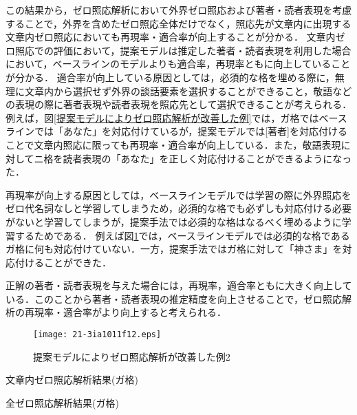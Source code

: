\documentclass[japanese]{jnlp_1.4}
\begin{document}
この結果から，ゼロ照応解析において外界ゼロ照応および著者・読者表現を考慮することで，外界を含めたゼロ照応全体だけでなく，照応先が文章内に出現する文章内ゼロ照応においても再現率・適合率が向上することが分かる．
文章内ゼロ照応での評価において，提案モデルは推定した著者・読者表現を利用した場合において，ベースラインのモデルよりも適合率，再現率ともに向上していることが分かる．
適合率が向上している原因としては，必須的な格を埋める際に，無理に文章内から選択せず外界の談話要素を選択することができること，敬語などの表現の際に著者表現や読者表現を照応先として選択できることが考えられる．
例えば，図\ref{提案モデルによりゼロ照応解析が改善した例}では，ガ格ではベースラインでは「あなた」を対応付けているが，提案モデルでは[著者]を対応付けることで文章内照応に限っても再現率・適合率が向上している．また，敬語表現に対してニ格を読者表現の「あなた」を正しく対応付けることができるようになった．

再現率が向上する原因としては，ベースラインモデルでは学習の際に外界照応をゼロ代名詞なしと学習してしまうため，必須的な格でも必ずしも対応付ける必要がないと学習してしまうが，提案手法では必須的な格はなるべく埋めるように学習するためである．
例えば図\ref{提案モデルによりゼロ照応解析が改善した例2}では，ベースラインモデルでは必須的な格であるガ格に何も対応付けていない．一方，提案手法ではガ格に対して「神さま」を対応付けることができた．

正解の著者・読者表現を与えた場合には，再現率，適合率ともに大きく向上している．このことから著者・読者表現の推定精度を向上させることで，ゼロ照応解析の再現率・適合率がより向上すると考えられる．

\begin{figure}[b]
\texttt{[image: 21-3ia1011f12.eps]}
\caption{提案モデルによりゼロ照応解析が改善した例2}
\label{提案モデルによりゼロ照応解析が改善した例2}
\end{figure}
\begin{table}[b]
\begin{minipage}{0.49\textwidth}
\caption{文章内ゼロ照応解析結果(ガ格)}
\label{文章内ゼロ照応解析結果(ガ格)}

\end{minipage}
\hfill
\begin{minipage}{0.49\textwidth}
\caption{全ゼロ照応解析結果(ガ格)}
\label{全ゼロ照応解析結果(ガ格)}

\end{minipage}
\end{table}
\end{document}
